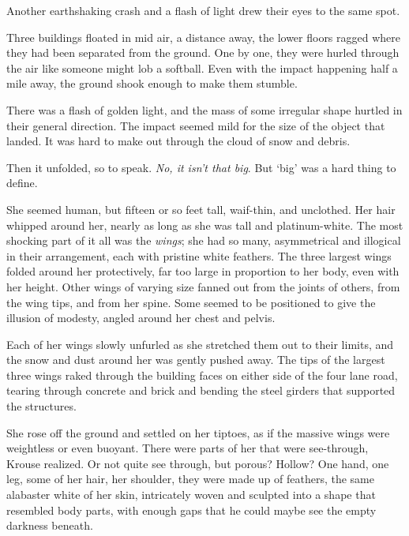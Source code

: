 Another earthshaking crash and a flash of light drew their eyes to the same spot.



Three buildings floated in mid air, a distance away, the lower floors ragged where they had been separated from the ground.  One by one, they were hurled through the air like someone might lob a softball.  Even with the impact happening half a mile away, the ground shook enough to make them stumble.



There was a flash of golden light, and the mass of some irregular shape hurtled in their general direction.  The impact seemed mild for the size of the object that landed.  It was hard to make out through the cloud of snow and debris.



Then it unfolded, so to speak.  \emph{No, it isn't that big}.  But `big' was a hard thing to define.



She seemed human, but fifteen or so feet tall, waif-thin, and unclothed.  Her hair whipped around her, nearly as long as she was tall and platinum-white.  The most shocking part of it all was the \emph{wings}; she had so many, asymmetrical and illogical in their arrangement, each with pristine white feathers.  The three largest wings folded around her protectively, far too large in proportion to her body, even with her height.  Other wings of varying size fanned out from the joints of others, from the wing tips, and from her spine.  Some seemed to be positioned to give the illusion of modesty, angled around her chest and pelvis.



Each of her wings slowly unfurled as she stretched them out to their limits, and the snow and dust around her was gently pushed away.  The tips of the largest three wings raked through the building faces on either side of the four lane road, tearing through concrete and brick and bending the steel girders that supported the structures.



She rose off the ground and settled on her tiptoes, as if the massive wings were weightless or even buoyant.  There were parts of her that were see-through, Krouse realized.  Or not quite see through, but porous?  Hollow?  One hand, one leg, some of her hair, her shoulder, they were made up of feathers, the same alabaster white of her skin, intricately woven and sculpted into a shape that resembled body parts, with enough gaps that he could maybe see the empty darkness beneath.



